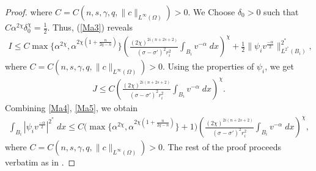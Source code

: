 \documentclass[11pt, notitlepage]{article}
\begin{document}
{\begin{proof}
where $C=C(n,s,\gamma, q,\|c\|_{L^\infty(\Omega)})>0$. We Choose $\delta_0>0$ such that $C\alpha^{2\chi}\delta_0^\chi=\frac{1}{2}.$ Thus, (\ref{Ma3}) reveals
\begin{align}\label{Ma4}
    I\leq C\max\{\alpha^{2\chi},\alpha^{2\chi(1+\frac{n}{2q-n})}\}\left(\frac{(2\chi)^{2i(n+2s+2)}}{(\sigma-\sigma')^2r_i^2}\int_{B_i}v^{-\alpha}\;dx\right)^\chi+\frac{1}{2}\|\psi_iv^\frac{-\alpha}{2}\|_{L^{2^*}(B_i)}^{2^*},
\end{align}
where $C=C(n,s,\gamma, q,\|c\|_{L^\infty(\Omega)})>0$. Using the properties of $\psi_i$, we get
\begin{align}\label{Ma5}
    J\leq C\left(\frac{(2\chi)^{2i(n+2s+2)}}{(\sigma-\sigma')^2r_i^2}\int_{B_i}v^{-\alpha}\;dx\right)^\chi.
\end{align}
Combining \eqref{Ma4}, \eqref{Ma5}, we obtain
\begin{align}
    \int_{B_{i}}|\psi_i v^\frac{-\alpha}{2}|^{2^*}\;dx\leq C\Big(\max\{\alpha^{2\chi},\alpha^{2\chi(1+\frac{n}{2q-n})}\}+1\Big)\left(\frac{(2\chi)^{2i(n+2s+2)}}{(\sigma-\sigma')^2r_i^2}\int_{B_i}v^{-\alpha}\;dx\right)^\chi,
\end{align}
where $C=C(n,s,\gamma, q,\|c\|_{L^\infty(\Omega)})>0$. The rest of the proof proceeds verbatim as in \cite[Lemma 4.1]{Garain25}.
\end{proof}

}
\end{document}
